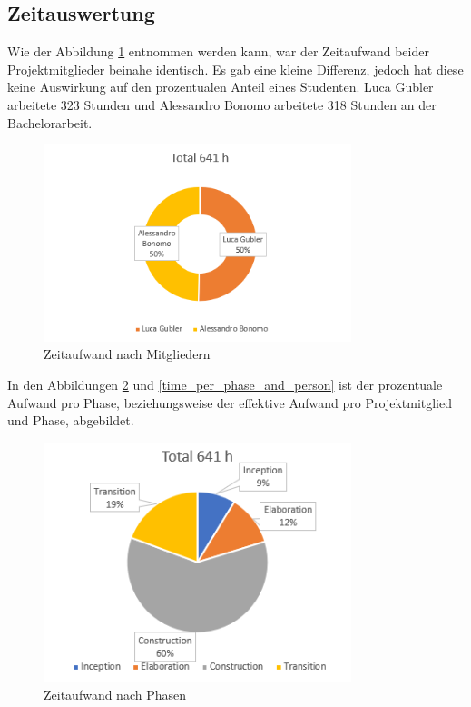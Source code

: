 \newpage


\subsection{Zeitauswertung}
Wie der Abbildung \ref{time_per_student} entnommen werden kann, war der Zeitaufwand beider Projektmitglieder beinahe identisch. Es gab eine kleine Differenz, jedoch hat diese keine Auswirkung auf den prozentualen Anteil eines Studenten. Luca Gubler arbeitete 323 Stunden und Alessandro Bonomo arbeitete 318 Stunden an der Bachelorarbeit.

	\begin{figure}[H]
	\begin{center}
	
		\includegraphics[width=0.8\textwidth, height=\textheight, keepaspectratio]{images/Zeitauswertung/Arbeitsaufwand_Personen.png}
		\caption{Zeitaufwand nach Mitgliedern}
		\label{time_per_student}
		\end{center}
\end{figure}

In den Abbildungen \ref{time_per_phase} und \ref{time_per_phase_and_person} ist der prozentuale Aufwand pro Phase, beziehungsweise der effektive Aufwand pro Projektmitglied und Phase, abgebildet.

	\begin{figure}[H]
\begin{center}

		\includegraphics[width=0.8\textwidth, height=\textheight, keepaspectratio]{images/Zeitauswertung/Prozentualer_Aufwand_Phasen.png}
		\caption{Zeitaufwand nach Phasen}
		\label{time_per_phase}
	\end{center}		
\end{figure}

